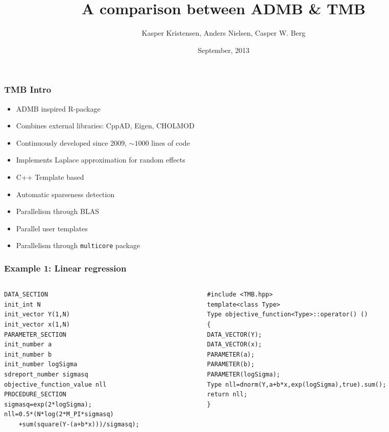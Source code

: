 \documentclass[compress]{beamer}
\title[TMB]
{A comparison between ADMB \& TMB}
\author[K. Kristensen, A. Nielsen, C.W. Berg ]%
{Kasper Kristensen, Anders Nielsen, Casper W. Berg}
\date[September 2013] %
{September, 2013}
\begin{document}
\begin{frame}[plain]
  \titlepage
\end{frame}

\begin{frame}
\frametitle{TMB Intro}

\begin{itemize}
  \item ADMB inspired R-package
  \item Combines external libraries: CppAD, Eigen, CHOLMOD
  \item Continuously developed since 2009, $\sim 1000$ lines of code
  \item Implements Laplace approximation for random effects
  \item C++ Template based
  \item Automatic sparseness detection
  \item Parallelism through BLAS
  \item Parallel user templates
  \item Parallelism through \texttt{multicore} package 
\end{itemize}


\end{frame}

\begin{frame}[fragile]
  \frametitle{Example 1: Linear regression}
\begin{columns}
    \begin{column}{0.5\textwidth}
\tiny{
\begin{verbatim}
DATA_SECTION
init_int N
init_vector Y(1,N)
init_vector x(1,N)
PARAMETER_SECTION
init_number a
init_number b
init_number logSigma
sdreport_number sigmasq
objective_function_value nll
PROCEDURE_SECTION
sigmasq=exp(2*logSigma);
nll=0.5*(N*log(2*M_PI*sigmasq)
    +sum(square(Y-(a+b*x)))/sigmasq);
\end{verbatim}
}
    \end{column}
\hspace{-50pt}
\vrule{}
    \begin{column}{0.5\textwidth} 
   \tiny{
    \begin{verbatim}
#include <TMB.hpp>
template<class Type>
Type objective_function<Type>::operator() ()
{
DATA_VECTOR(Y);
DATA_VECTOR(x);
PARAMETER(a);
PARAMETER(b);
PARAMETER(logSigma);
Type nll=dnorm(Y,a+b*x,exp(logSigma),true).sum();
return nll;
}
    \end{verbatim}
}

\end{column}
\end{columns}
\end{frame}
\end{document}

